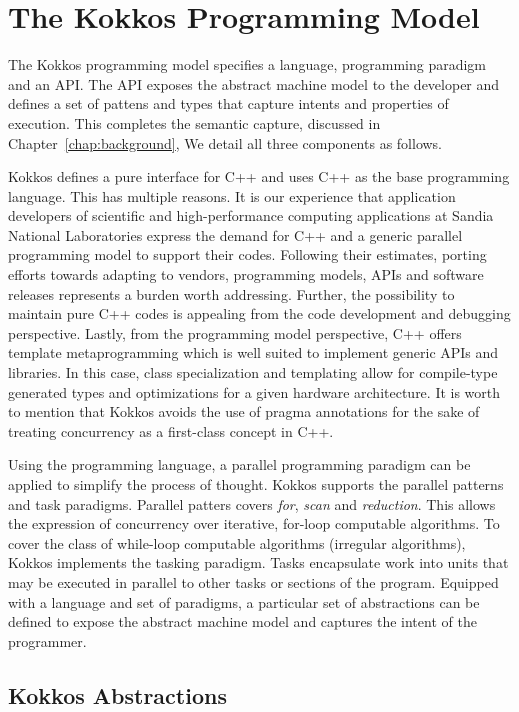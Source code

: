 \section{The Kokkos Programming Model}\label{chap:kokkosPM}
The Kokkos programming model specifies a language, programming paradigm and an API. The API exposes the abstract machine model to the developer and defines a set of pattens and types that capture intents and properties of execution. This completes the semantic capture, discussed in Chapter~\ref{chap:background}, We detail all three components as follows.

Kokkos defines a pure interface for C++ and uses C++ as the base programming language. This has multiple reasons. It is our experience that application developers of scientific and high-performance computing applications at Sandia National Laboratories express the demand for C++ and a generic parallel programming model to support their codes. Following their estimates, porting efforts towards adapting to vendors, programming models, APIs and software releases represents a burden worth addressing. Further, the possibility to maintain pure C++ codes is appealing from the code development and debugging perspective. 
Lastly, from the programming model perspective, C++ offers template metaprogramming which is well suited to implement generic APIs and libraries. In this case, class specialization and templating allow for compile-type generated types and optimizations for a given hardware architecture. It is worth to mention that Kokkos avoids the use of pragma annotations for the sake of treating concurrency as a first-class concept in C++.

Using the programming language, a parallel programming paradigm can be applied to simplify the process of thought. Kokkos supports the parallel patterns and task paradigms. Parallel patters covers \emph{for}, \emph{ scan} and \emph{reduction}. This allows the expression of concurrency over iterative, for-loop computable algorithms. To cover the class of while-loop computable algorithms (irregular algorithms), Kokkos implements the tasking paradigm. Tasks encapsulate work into units that may be executed in parallel to other tasks or sections of the program. Equipped with a language and set of paradigms, a particular set of abstractions can be defined to expose the abstract machine model and captures the intent of the programmer.


\subsection{Kokkos Abstractions}


